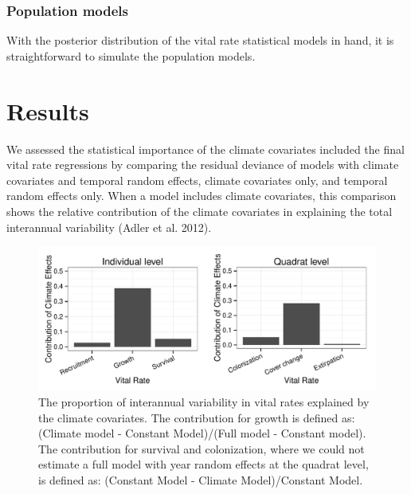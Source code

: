 \documentclass[author-year, 12pt,review]{components/elsarticle} %
\makeatletter
\def\maxwidth{\ifdim\Gin@nat@width>\linewidth\linewidth
\else\Gin@nat@width\fi}
\let\Oldincludegraphics\includegraphics
\renewcommand{\includegraphics}[1]{\Oldincludegraphics[width=\maxwidth]{#1}}
\makeatother
\begin{document}
\subsubsection{Population models}\label{population-models}

With the posterior distribution of the vital rate statistical models in
hand, it is straightforward to simulate the population models.

\section{Results}\label{results}

We assessed the statistical importance of the climate covariates
included the final vital rate regressions by comparing the residual
deviance of models with climate covariates and temporal random effects,
climate covariates only, and temporal random effects only. When a model
includes climate covariates, this comparison shows the relative
contribution of the climate covariates in explaining the total
interannual variability (Adler et al. 2012).

\begin{figure}[htbp]
\centering
\includegraphics{components/figure/manuscript-figure_1.pdf}
\caption{The proportion of interannual variability in vital rates
explained by the climate covariates. The contribution for growth is
defined as: (Climate model - Constant Model)/(Full model - Constant
model). The contribution for survival and colonization, where we could
not estimate a full model with year random effects at the quadrat level,
is defined as: (Constant Model - Climate Model)/Constant Model.}
\end{figure}
\end{document}
